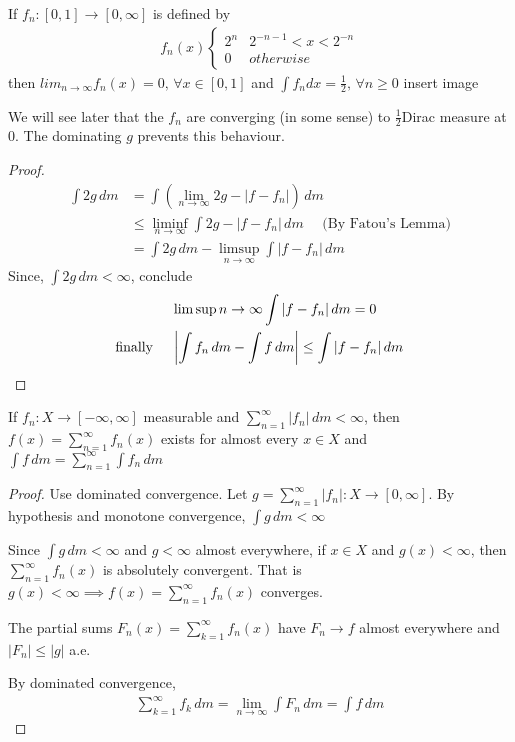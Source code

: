 \begin{example}
	If $f_n : [0,1] \to [0, \infty]$ is defined by
	\begin{align*}
		f_n (x)
		\begin{cases}
			2^n & 2^{-n-1} < x < 2^{-n} \\
			0 & otherwise
		\end{cases}
	\end{align*}
	then $lim_{n \to \infty} f_n (x) = 0, \, \forall x \in [0,1]$ and  $\int f_{n} dx = \frac{1}{2} ,\, \forall n \geq 0$
	insert image
\end{example}

We will see later that the $f_{n}$ are converging (in some sense) to $\frac{1}{2}$Dirac measure at $0$. The dominating $g$ prevents this behaviour.

\begin{proof}
	\begin{align*}
		\int 2g \, dm &= \int \left( \lim_{n \to \infty} 2g - | f - f_{n}| \right) \, dm \\
				   &\leq \liminf_{n \to \infty} \int 2g - |f - f_{n}|\, dm \quad \text{ (By Fatou's Lemma)} \\
				   &= \int 2g \, dm - \limsup_{n \to \infty} \int | f - f_{n}| \, dm
	\end{align*}
	Since, $\int 2g \, dm < \infty$, conclude
	\begin{align*}
		&\limsup{n \to \infty} \int |f - f_n | \, dm = 0 \\ \text{finally \quad}
		& \left| \int f_n \, dm - \int f \, dm \right| \leq \int | f - f_n | \, dm
	\end{align*}
\end{proof}

\begin{corollary}
	If $f_{n} : X \to [-\infty, \infty]$ measurable and $\sum_{n=1}^{\infty} | f_n | \, dm < \infty$,
	then $f(x) = \sum_{n=1}^{\infty}f_n (x)$ exists for almost every $x \in X$ and $\int f \, dm = \sum_{n=1}^{\infty} \int f_{n} \, dm$
\end{corollary}

\begin{proof}
	Use dominated convergence. Let $g = \sum_{n=1}^{\infty} | f_n | : X \to [0,\infty]$.
	By hypothesis and monotone convergence, $\int g \, dm < \infty$

	Since $\int g \, dm < \infty$ and $g < \infty$ almost everywhere, if $x \in X$ and $g(x) < \infty$,
	then $\sum_{n=1}^{\infty} f_{n} (x)$ is absolutely convergent. That is $g(x) < \infty \implies f(x) = \sum_{n=1}^{\infty} f_{n}(x)$ converges.

	The partial sums $F_n (x) = \sum_{k=1}^{\infty} f_{n}(x)$ have $F_n \to f$ almost everywhere and $|F_{n}| \leq |g|$ a.e.

	By dominated convergence,
	\begin{align*}
	\sum_{k=1}^{\infty}f_{k} \, dm = \lim_{n \to \infty} \int F_n \, dm = \int f \, dm
	\end{align*}
\end{proof}


